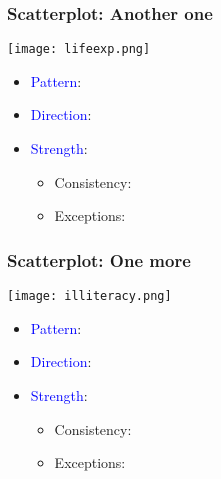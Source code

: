 \documentclass{beamer}
\newcommand{\blue}{\textcolor{blue}}
\begin{document}
\begin{frame}
 \frametitle<+->{Scatterplot: Another one}
 \begin{minipage}{.5\linewidth}
 \texttt{[image: lifeexp.png]}
 \end{minipage}\hfill
 \begin{minipage}{.48\linewidth}
 \begin{itemize}
   \item \blue{Pattern}: 
   \item \blue{Direction}: 
   \item \blue{Strength}: 
     \begin{itemize}
       \item Consistency: 
       \item Exceptions: 
     \end{itemize}
 \end{itemize}
 \end{minipage}
\end{frame}

\begin{frame}
 \frametitle<+->{Scatterplot: One more}
 \begin{minipage}{.5\linewidth}
 \texttt{[image: illiteracy.png]}
 \end{minipage}\hfill
 \begin{minipage}{.48\linewidth}
 \begin{itemize}
   \item \blue{Pattern}: 
   \item \blue{Direction}: 
   \item \blue{Strength}: 
     \begin{itemize}
       \item Consistency: 
       \item Exceptions: 
     \end{itemize}
 \end{itemize}
 \end{minipage}
\end{frame}
\end{document}
